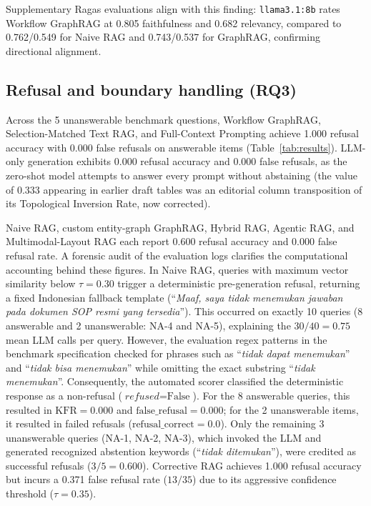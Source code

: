 \documentclass[preprint,10pt]{elsarticle}
\begin{document}
Supplementary Ragas evaluations align with this finding: \texttt{llama3.1:8b} rates Workflow GraphRAG at 0.805 faithfulness and 0.682 relevancy, compared to 0.762/0.549 for Naive RAG and 0.743/0.537 for GraphRAG, confirming directional alignment.

\subsection{Refusal and boundary handling (RQ3)}
Across the 5 unanswerable benchmark questions, Workflow GraphRAG, Selection-Matched Text RAG, and Full-Context Prompting achieve 1.000 refusal accuracy with 0.000 false refusals on answerable items (Table~\ref{tab:results}). LLM-only generation exhibits 0.000 refusal accuracy and 0.000 false refusals, as the zero-shot model attempts to answer every prompt without abstaining (the value of 0.333 appearing in earlier draft tables was an editorial column transposition of its Topological Inversion Rate, now corrected).

Naive RAG, custom entity-graph GraphRAG, Hybrid RAG, Agentic RAG, and Multimodal-Layout RAG each report 0.600 refusal accuracy and 0.000 false refusal rate. A forensic audit of the evaluation logs clarifies the computational accounting behind these figures. In Naive RAG, queries with maximum vector similarity below $\tau=0.30$ trigger a deterministic pre-generation refusal, returning a fixed Indonesian fallback template (``\textit{Maaf, saya tidak menemukan jawaban pada dokumen SOP resmi yang tersedia}''). This occurred on exactly 10 queries (8 answerable and 2 unanswerable: NA-4 and NA-5), explaining the $30/40 = 0.75$ mean LLM calls per query. However, the evaluation regex patterns in the benchmark specification checked for phrases such as ``\textit{tidak dapat menemukan}'' and ``\textit{tidak bisa menemukan}'' while omitting the exact substring ``\textit{tidak menemukan}''. Consequently, the automated scorer classified the deterministic response as a non-refusal ($\textit{refused} = \text{False}$). For the 8 answerable queries, this resulted in $\text{KFR} = 0.000$ and $\text{false\_refusal} = 0.000$; for the 2 unanswerable items, it resulted in failed refusals ($\text{refusal\_correct} = 0.0$). Only the remaining 3 unanswerable queries (NA-1, NA-2, NA-3), which invoked the LLM and generated recognized abstention keywords (``\textit{tidak ditemukan}''), were credited as successful refusals ($3/5 = 0.600$). Corrective RAG achieves 1.000 refusal accuracy but incurs a 0.371 false refusal rate ($13/35$) due to its aggressive confidence threshold ($\tau=0.35$).
\end{document}
